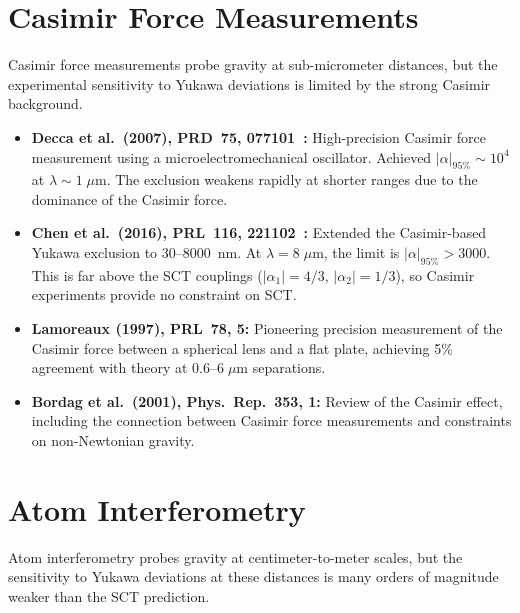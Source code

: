 \documentclass[11pt,a4paper]{article}
\begin{document}
\section{Casimir Force Measurements}
\label{sec:casimir}

Casimir force measurements probe gravity at sub-micrometer distances, but the
experimental sensitivity to Yukawa deviations is limited by the strong Casimir
background.

\begin{itemize}[leftmargin=2em]
  \item \textbf{Decca et al.\ (2007), PRD~75, 077101~\cite{decca2007}:}
    High-precision Casimir force measurement using a microelectromechanical
    oscillator. Achieved $|\alpha|_{\text{95\%}} \sim 10^4$ at $\lambda \sim
    1\;\mu$m. The exclusion weakens rapidly at shorter ranges due to the
    dominance of the Casimir force.

  \item \textbf{Chen et al.\ (2016), PRL~116, 221102~\cite{chen2016}:}
    Extended the Casimir-based Yukawa exclusion to $30$--$8000$~nm. At
    $\lambda = 8\;\mu$m, the limit is $|\alpha|_{\text{95\%}} > 3000$.
    This is far above the SCT couplings ($|\alpha_1| = 4/3$, $|\alpha_2| = 1/3$),
    so Casimir experiments provide no constraint on SCT.

  \item \textbf{Lamoreaux (1997), PRL~78, 5:}
    Pioneering precision measurement of the Casimir force between a spherical
    lens and a flat plate, achieving 5\% agreement with theory at
    $0.6$--$6\;\mu$m separations.

  \item \textbf{Bordag et al.\ (2001), Phys.\ Rep.~353, 1:}
    Review of the Casimir effect, including the connection between Casimir
    force measurements and constraints on non-Newtonian gravity.
\end{itemize}

\section{Atom Interferometry}
\label{sec:atom-interferometry}

Atom interferometry probes gravity at centimeter-to-meter scales, but the
sensitivity to Yukawa deviations at these distances is many orders of magnitude
weaker than the SCT prediction.
\end{document}
